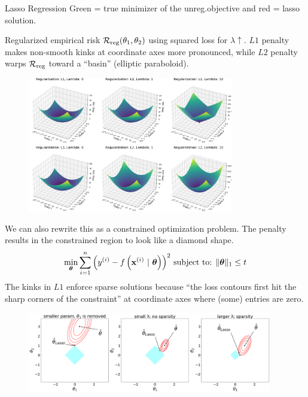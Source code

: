 \documentclass[11pt,compress,t,notes=noshow, xcolor=table]{beamer}
\begin{document}
\begin{vbframe}{Lasso Regression}
Green  = true minimizer of the unreg.objective and red = lasso solution.

\framebreak

Regularized empirical risk $\mathcal{R}_{\text{reg}}(\theta_1,\theta_2)$ using squared loss for $\lambda \uparrow$. $L1$ penalty makes non-smooth kinks at coordinate axes more pronounced, while $L2$ penalty warps $\mathcal{R}_{\text{reg}}$ toward a ``basin'' (elliptic paraboloid). 
 
\begin{figure}
\includegraphics[width=0.8\textwidth]{figure/reg_surfaces_l1_l2.png}\\
\end{figure}

\framebreak

We can also rewrite this as a constrained optimization problem. The penalty results in the constrained region to look like a diamond shape.
\vspace{-0.2cm}
\begin{eqnarray*}
\min_{\bm{\theta}} \sum\limits_{i=1}^n \left(y^{(i)} - f\left(\mathbf{x}^{(i)} ~|~ \bm{\theta}\right)\right)^2\,
\text{subject to: } \|\bm{\theta}\|_1 \leq t
\end{eqnarray*}
The kinks in $L1$ enforce sparse solutions because ``the loss contours first hit the sharp corners of the constraint'' at coordinate axes where (some) entries are zero. 
\vspace{-0.1cm}
\begin{figure}%
\includegraphics[width=0.95\textwidth]{figure/lasso_contours_cases.png}\\
\end{figure}

\end{vbframe}
\end{document}
